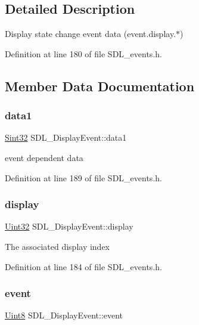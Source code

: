 \subsection{Detailed Description}
Display state change event data (event.\+display.$\ast$) 

Definition at line 180 of file S\+D\+L\+\_\+events.\+h.



\subsection{Member Data Documentation}
\mbox{\label{struct_s_d_l___display_event_a4feb7329af16a060cc16d539e5cb13b5}} 
\subsubsection{\texorpdfstring{data1}{data1}}
{\footnotesize\ttfamily \mbox{\hyperlink{_s_d_l__stdinc_8h_a7a90b941db9d4582e9ad7abb9940ff7e}{Sint32}} S\+D\+L\+\_\+\+Display\+Event\+::data1}

event dependent data 

Definition at line 189 of file S\+D\+L\+\_\+events.\+h.

\mbox{\label{struct_s_d_l___display_event_af7159e813fb168a2fdfe5070e6026a39}} 
\subsubsection{\texorpdfstring{display}{display}}
{\footnotesize\ttfamily \mbox{\hyperlink{_s_d_l__stdinc_8h_add440eff171ea5f55cb00c4a9ab8672d}{Uint32}} S\+D\+L\+\_\+\+Display\+Event\+::display}

The associated display index 

Definition at line 184 of file S\+D\+L\+\_\+events.\+h.

\mbox{\label{struct_s_d_l___display_event_a4850a90c06e18146d6a2ac235cdd7336}} 
\subsubsection{\texorpdfstring{event}{event}}
{\footnotesize\ttfamily \mbox{\hyperlink{_s_d_l__stdinc_8h_a2944638813a090aa23e62f4da842c3e2}{Uint8}} S\+D\+L\+\_\+\+Display\+Event\+::event}

